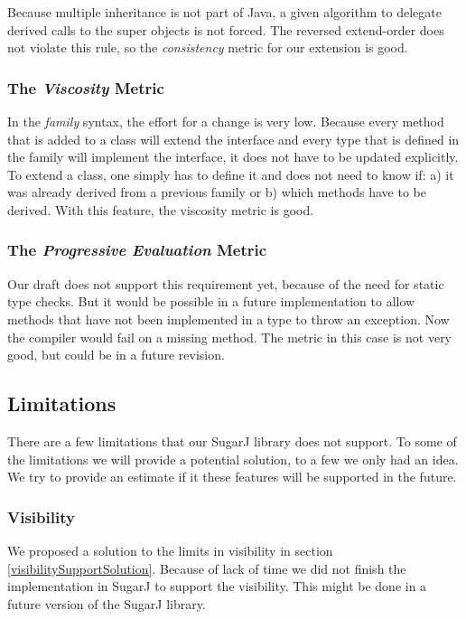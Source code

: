 \documentclass{report}
\begin{document}
Because multiple inheritance is not part of Java, a given algorithm to delegate derived calls to the super objects is not forced. The reversed extend-order does not violate this rule, so the \emph{consistency} metric for our extension is good.

\subsubsection*{The \emph{Viscosity} Metric}

In the \emph{family} syntax, the effort for a change is very low. Because every method that is added to a class will extend the interface and every type that is defined in the family will implement the interface, it does not have to be updated explicitly. To extend a class, one simply has to define it and does not need to know if: a) it was already derived from a previous family or b) which methods have to be derived. With this feature, the viscosity metric is good.

\subsubsection*{The \emph{Progressive Evaluation} Metric}

Our draft does not support this requirement yet, because of the need for static type checks. But it would be possible in a future implementation to allow methods that have not been implemented in a type to throw an exception. Now the compiler would fail on a missing method. The metric in this case is not very good, but could be in a future revision.


\subsection{Limitations}
\label{syntaxExtensionLimitations}

There are a few limitations that our SugarJ library does not support. To some of the limitations we will provide a potential solution, to a few we only had an idea. We try to provide an estimate if it these features will be supported in the future.

\subsubsection*{Visibility}

We proposed a solution to the limits in visibility in section \ref{visibilitySupportSolution}. Because of lack of time we did not finish the implementation in SugarJ to support the visibility. This might be done in a future version of the SugarJ library.
\end{document}
